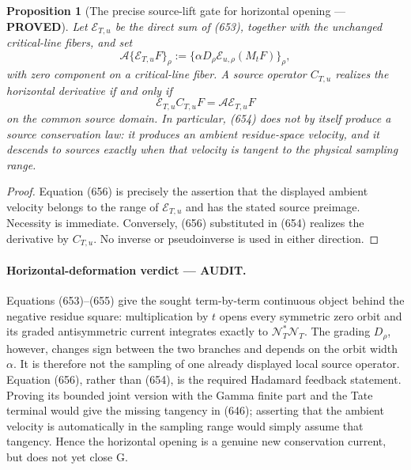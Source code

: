 \documentclass[11pt]{article}
\newtheorem{proposition}[theorem]{Proposition}
\newcommand{\PROVED}{\textcolor{green!45!black}{\textbf{PROVED}}}
\newcommand{\AUDIT}{\textcolor{orange!75!black}{\textbf{AUDIT}}}
\begin{document}
\begin{proposition}[The precise source-lift gate for horizontal opening ---
\PROVED]
Let \(\mathcal E_{T,u}\) be the direct sum of (653), together with the
unchanged critical-line fibers, and set
\[
 \mathscr A\{\mathcal E_{T,u}F\}_\rho
 :=\{\alpha D_\rho\mathcal E_{u,\rho}(M_tF)\}_\rho,
\]
with zero component on a critical-line fiber.  A source operator
\(C_{T,u}\) realizes the horizontal derivative if and only if
\begin{equation}
 \boxed{\mathcal E_{T,u}C_{T,u}F
       =\mathscr A\mathcal E_{T,u}F}                 \tag{656}
\end{equation}
on the common source domain.  In particular, (654) does not by itself
produce a source conservation law: it produces an ambient residue-space
velocity, and it descends to sources exactly when that velocity is tangent
to the physical sampling range.
\end{proposition}

\begin{proof}
Equation (656) is precisely the assertion that the displayed ambient
velocity belongs to the range of \(\mathcal E_{T,u}\) and has the stated
source preimage.  Necessity is immediate.  Conversely, (656) substituted
in (654) realizes the derivative by \(C_{T,u}\).  No inverse or
pseudoinverse is used in either direction.
\end{proof}

\paragraph{Horizontal-deformation verdict --- \AUDIT.}
Equations (653)--(655) give the sought term-by-term continuous object behind
the negative residue square: multiplication by \(t\) opens every symmetric
zero orbit and its graded antisymmetric current integrates exactly to
\(\mathcal N_T^*\mathcal N_T\).  The grading \(D_\rho\), however, changes
sign between the two branches and depends on the orbit width \(\alpha\).
It is therefore not the sampling of one already displayed local source
operator.  Equation (656), rather than (654), is the required Hadamard
feedback statement.  Proving its bounded joint version with the Gamma
finite part and the Tate terminal would give the missing tangency in
(646); asserting that the ambient velocity is automatically in the
sampling range would simply assume that tangency.  Hence the horizontal
opening is a genuine new conservation current, but does not yet close G.
\end{document}
